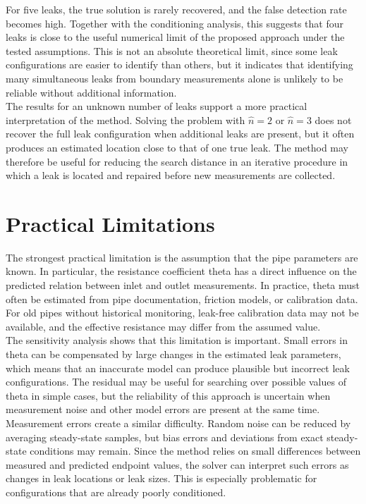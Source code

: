 For five leaks, the true solution is rarely recovered, and the false detection rate becomes high. Together with the conditioning analysis, this suggests that four leaks is close to the useful numerical limit of the proposed approach under the tested assumptions. This is not an absolute theoretical limit, since some leak configurations are easier to identify than others, but it indicates that identifying many simultaneous leaks from boundary measurements alone is unlikely to be reliable without additional information.\\

The results for an unknown number of leaks support a more practical interpretation of the method. Solving the problem with $\hat{n} = 2$ or $\hat{n} = 3$ does not recover the full leak configuration when additional leaks are present, but it often produces an estimated location close to that of one true leak. The method may therefore be useful for reducing the search distance in an iterative procedure in which a leak is located and repaired before new measurements are collected.

\section{Practical Limitations}

The strongest practical limitation is the assumption that the pipe parameters are known. In particular, the resistance coefficient \gls{theta} has a direct influence on the predicted relation between inlet and outlet measurements. In practice, \gls{theta} must often be estimated from pipe documentation, friction models, or calibration data. For old pipes without historical monitoring, leak-free calibration data may not be available, and the effective resistance may differ from the assumed value.\\

The sensitivity analysis shows that this limitation is important. Small errors in \gls{theta} can be compensated by large changes in the estimated leak parameters, which means that an inaccurate model can produce plausible but incorrect leak configurations. The residual may be useful for searching over possible values of \gls{theta} in simple cases, but the reliability of this approach is uncertain when measurement noise and other model errors are present at the same time.\\

Measurement errors create a similar difficulty. Random noise can be reduced by averaging steady-state samples, but bias errors and deviations from exact steady-state conditions may remain. Since the method relies on small differences between measured and predicted endpoint values, the solver can interpret such errors as changes in leak locations or leak sizes. This is especially problematic for configurations that are already poorly conditioned.\\

